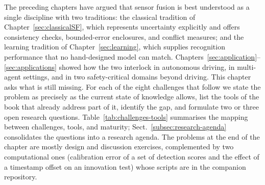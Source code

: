 \documentclass[graybox,envcountchap]{style/SNmono}
\begin{document}
\suppressfloats[t]

The preceding chapters have argued that sensor fusion is best understood as a single discipline with two traditions: the classical tradition of Chapter~\ref{sec:classicalSF}, which represents uncertainty explicitly and offers consistency checks, bounded-error enclosures, and conflict measures; and the learning tradition of Chapter~\ref{sec:learning}, which supplies recognition performance that no hand-designed model can match. Chapters~\ref{sec:application}--\ref{sec:applications} showed how the two interlock in autonomous driving, in multi-agent settings, and in two safety-critical domains beyond driving. This chapter asks what is still missing. For each of the eight challenges that follow we state the problem as precisely as the current state of knowledge allows, list the tools of the book that already address part of it, identify the gap, and formulate two or three open research questions. Table~\ref{tab:challenges-tools} summarises the mapping between challenges, tools, and maturity; Sect.~\ref{subsec:research-agenda} consolidates the questions into a research agenda. The problems at the end of the chapter are mostly design and discussion exercises, complemented by two computational ones (calibration error of a set of detection scores and the effect of a timestamp offset on an innovation test) whose scripts are in the companion repository.
\end{document}
